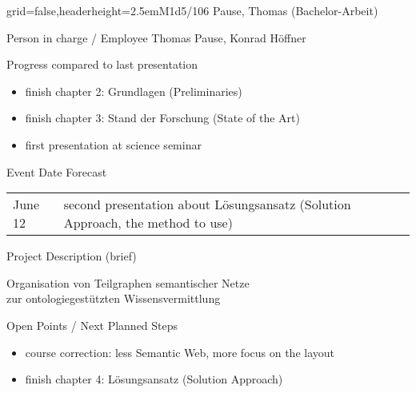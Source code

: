 \documentclass[]{kiesgrube}
\begin{document}
\begin{poster}%
{grid=false,headerheight=2.5em}{}{M1d5/106 Pause, Thomas (Bachelor-Arbeit)}{}

\begin{posterbox}[name=person,column=0,row=0]{Person in charge / Employee}
Thomas Pause, Konrad Höffner
\end{posterbox}
\begin{posterbox}[name=progress,below=person]{Progress compared to last presentation}
\begin{itemize}
\item finish chapter 2: Grundlagen (Preliminaries)
\item finish chapter 3: Stand der Forschung (State of the Art)
\item first presentation at science seminar
\end{itemize}
\end{posterbox}
\begin{posterbox}[name=event,below=progress]{Event Date Forecast}
\begin{tabulary}{\textwidth}{lL}
June 12 	&second presentation about Lösungsansatz (Solution Approach, the method to use)\\
\end{tabulary}
\end{posterbox}
\begin{posterbox}[name=description,column=1,row=0]{Project Description (brief)}
\begin{center}
Organisation von Teilgraphen semantischer Netze\\
zur ontologiegestützten Wissensvermittlung
\end{center}
\end{posterbox}
\begin{posterbox}[name=open,column=1,below=description]{Open Points / Next Planned Steps}
\begin{itemize}
\item course correction: less Semantic Web, more focus on the layout 
\item finish chapter 4: Lösungsansatz (Solution Approach)

\end{itemize}
\end{posterbox}
\end{poster}
\end{document}
